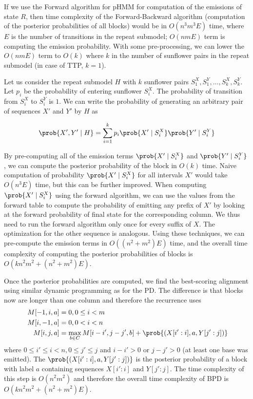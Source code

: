If we use the Forward algorithm for pHMM for computation of the emissions of
state $R$, then time complexity of the Forward-Backward algorithm (computation
of the posterior probabilities of all blocks) would be in $O(n^3m^3E)$ time,
where $E$ is the number of transitions in the repeat submodel; $O(nmE)$ term is
computing the emission probability. With some pre-processing, we can lower the
$O(nmE)$ term to $O(k)$ where $k$ in the number of sunflower pairs in the
repeat submodel (in case of TTP, $k=1$).

Let us consider the repeat submodel $H$ with $k$ sunflower pairs $S^X_1, S^Y_1,
\dots, S^X_k, S^Y_k$. Let $p_i$ be the probability of entering sunflower
$S^X_i$.  The probability of transition from $S^X_i$ to $S^Y_i$ is $1$. We can
write the probability of generating an arbitrary pair of sequences $X'$ and
$Y'$ by $H$ as

\begin{equation}
\prob{X', Y'\mid H} = \sum_{i=1}^k p_i\prob{X'\mid S^X_i}\prob{Y'\mid S^Y_i}
\end{equation}

By pre-computing all of the emission terms $\prob{X'\mid S^X_i}$ and $\prob{Y'\mid
S^Y_i}$, we can compute the posterior probability of the block in $O(k)$ time.
Naive computation of probability $\prob{X'\mid S^X_i}$ for all intervals $X'$
would take $O(n^3E)$ time, but this can be further improved. When computing
$\prob{X'\mid S^X_i}$ using the forward algorithm, we can use the values from
the forward table to compute the probability of emitting any prefix of $X'$ by
looking at the forward probability of final state for the corresponding column.
We thus need to run the forward algorithm only once for every suffix of $X$.
The optimization for the other sequence is analogous. Using these techniques,
we can pre-compute the emission terms in $O((n^2+m^2)E)$ time, and the overall
time complexity of computing the posterior probabilities of blocks is
$O(kn^2m^2 + (n^2+m^2)E)$. 

Once the posterior probabilities are computed, we find the best-scoring alignment 
using similar dynamic programming as for the PD. The difference is that blocks
now are longer than one column and therefore the recurrence uses   
\begin{align} 
M[-1,i,a] &= 0, 0\leq i < m\\\
M[i,-1,a] &= 0, 0< i < n\\
M[i,j,a] &= \max_{b\in C}
 M[i-i',j-j',b]+\prob{(X[i':i],a, Y[j':j])}
\end{align}
where $0\leq i'\leq i<n,0\leq j'\leq j$ and $i-i'>0$ or $j-j'>0$ (at least one
base was emitted).  The $\prob{(X[i':i],a, Y[j':j])}$ is the posterior
probability of a block with label $a$ containing sequences $X[i':i]$ and
$Y[j':j]$. The time complexity of this step is $O(n^2m^2)$ and therefore the
overall time complexity of BPD is $O(kn^2m^2 + (n^2+m^2)E)$.

